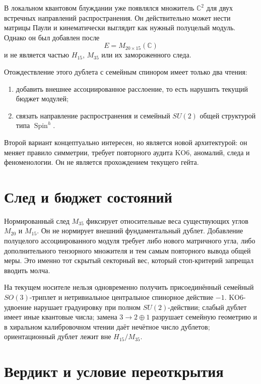 В локальном квантовом блуждании уже появлялся множитель $\mathbb C^2$ для
двух встречных направлений распространения. Он действительно может нести
матрицы Паули и кинематически выглядит как нужный полуцелый модуль.
Однако он был добавлен после
\begin{equation}
 E=M_{20\times15}(\mathbb C)
\end{equation}
и не является частью $H_{15}$, $M_{35}$ или их замороженного следа.

Отождествление этого дублета с семейным спинором имеет только два чтения:
\begin{enumerate}
 \item добавить внешнее ассоциированное расслоение, то есть нарушить
 текущий бюджет модулей;
 \item связать направление распространения и семейный $SU(2)$ общей
 структурой типа $\operatorname{Spin}^h$.
\end{enumerate}
Второй вариант концептуально интересен, но является новой архитектурой:
он меняет правило симметрии, требует повторного аудита KO6, аномалий,
следа и феноменологии. Он не является прохождением текущего гейта.

\section{След и бюджет состояний}

Нормированный след $M_{35}$ фиксирует относительные веса существующих
углов $M_{20}$ и $M_{15}$. Он не нормирует внешний фундаментальный
дублет. Добавление полуцелого ассоциированного модуля требует либо нового
матричного угла, либо дополнительного тензорного множителя и тем самым
повторного вывода общей меры. Это именно тот скрытый секторный вес, который
стоп-критерий запрещал вводить молча.

\begin{nogocriterion}
На текущем носителе нельзя одновременно получить присоединённый семейный
$SO(3)$-триплет и нетривиальное центральное спинорное действие $-1$.
KO6-удвоение нарушает градуировку при полном $SU(2)$-действии; слабый
дублет имеет иные квантовые числа; замена $3\to2\oplus1$ разрушает
семейную геометрию и в хиральном калибровочном чтении даёт нечётное число
дублетов; ориентационный дублет лежит вне $H_{15}/M_{35}$.
\end{nogocriterion}

\section{Вердикт и условие переоткрытия}

